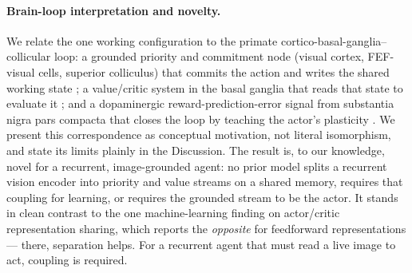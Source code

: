 \paragraph{Brain-loop interpretation and novelty.}
We relate the one working configuration to the primate cortico-basal-ganglia--collicular loop: a grounded priority and commitment node (visual cortex, FEF-visual cells, superior colliculus) that commits the action and writes the shared working state \citep{thompson2005neuronal, moore2001control, lovejoy2010inactivation, zenon2012attention}; a value/critic system in the basal ganglia that reads that state to evaluate it \citep{odoherty2004dissociable, maia2009reinforcement}; and a dopaminergic reward-prediction-error signal from substantia nigra pars compacta that closes the loop by teaching the actor's plasticity \citep{schultz1997neural, hollerman1998dopamine, morita2014striatal}. We present this correspondence as conceptual motivation, not literal isomorphism, and state its limits plainly in the Discussion. The result is, to our knowledge, novel for a recurrent, image-grounded agent: no prior model splits a recurrent vision encoder into priority and value streams on a shared memory, requires that coupling for learning, or requires the grounded stream to be the actor. It stands in clean contrast to the one machine-learning finding on actor/critic representation sharing, which reports the \emph{opposite} for feedforward representations --- there, separation helps. For a recurrent agent that must read a live image to act, coupling is required.
